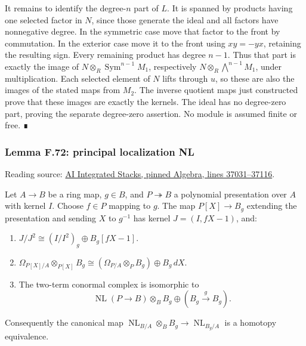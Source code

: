 \documentclass[11pt,a4paper,openany]{report}
\providecommand{\tightlist}{\setlength{\itemsep}{0pt}\setlength{\parskip}{0pt}}
\begin{document}
It remains to identify the degree-\(n\) part of \(L\). It is spanned by products having one selected factor in \(N\), since those generate the ideal and all factors have nonnegative degree. In the symmetric case move that factor to the front by commutation. In the exterior case move it to the front using \(xy=-yx\), retaining the resulting sign. Every remaining product has degree \(n-1\). Thus that part is exactly the image of \(N\otimes_R\operatorname{Sym}^{n-1}M_1\), respectively \(N\otimes_R\bigwedge^{n-1}M_1\), under multiplication. Each selected element of \(N\) lifts through \(u\), so these are also the images of the stated maps from \(M_2\). The inverse quotient maps just constructed prove that these images are exactly the kernels. The ideal has no degree-zero part, proving the separate degree-zero assertion. No module is assumed finite or free. ∎

\label{AG-RG-S05-algebra-lemma-principal-localization-NL}

\subsubsection{Lemma F.72: principal localization NL}\label{AG-RG-S05-lemma-f.72-principal-localization-nl}

Reading source: \href{https://github.com/KokunoYumeto/unofficial-stacks-project-ai-drafts/blob/565b10e987aba5969b21145a0833f42d69f96790/algebra.tex\#L37031-L37116}{AI Integrated Stacks, pinned Algebra, lines 37031--37116}.

Let \(A\to B\) be a ring map, \(g\in B\), and \(P\twoheadrightarrow B\) a polynomial presentation over \(A\) with kernel \(I\). Choose \(f\in P\) mapping to \(g\). The map \(P[X]\to B_g\) extending the presentation and sending \(X\) to \(g^{-1}\) has kernel \(J=(I,fX-1)\), and:

\begin{enumerate}
\def\labelenumi{\arabic{enumi}.}
\tightlist
\item
  \(J/J^2\cong(I/I^2)_g\oplus B_g[fX-1]\).
\item
  \(\Omega_{P[X]/A}\otimes_{P[X]}B_g\cong(\Omega_{P/A}\otimes_PB_g)\oplus B_g\,dX\).
\item
  The two-term conormal complex is isomorphic to \[\operatorname{NL}(P\to B)\otimes_BB_g
  \oplus(B_g\xrightarrow{g}B_g).\]
\end{enumerate}

Consequently the canonical map \(\operatorname{NL}_{B/A}\otimes_BB_g\to\operatorname{NL}_{B_g/A}\) is a homotopy equivalence.
\end{document}
